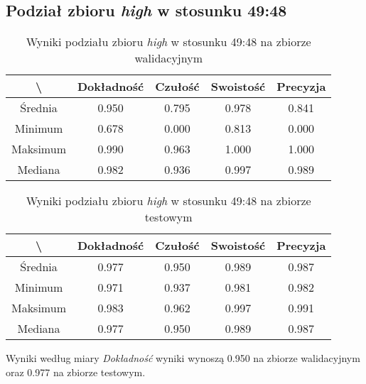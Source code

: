 \subsection{Podział zbioru \textit{high} w stosunku 49:48}


\begin{table}[H]
	\centering
	\caption{Wyniki podziału zbioru \textit{high} w stosunku 49:48 na zbiorze walidacyjnym}
	\vspace{6pt}
	{\footnotesize
		\begin{tabular}{|c|c|c|c|c|}
      \hline \textbackslash & Dokładność & Czułość & Swoistość & Precyzja \\
      \hline Średnia & 0.950 & 0.795 & 0.978 & 0.841 \\
      \hline Minimum & 0.678 & 0.000 & 0.813 & 0.000 \\
      \hline Maksimum & 0.990 & 0.963 & 1.000 & 1.000 \\
      \hline Mediana & 0.982 & 0.936 & 0.997 & 0.989 \\
      \hline
    \end{tabular}
    \label{Tab:highsplitd_val}
	}
	\vspace{0pt}
\end{table}

\begin{table}[H]
	\centering
	\caption{Wyniki podziału zbioru \textit{high} w stosunku 49:48 na zbiorze testowym}
	\vspace{6pt}
	{\footnotesize
		\begin{tabular}{|c|c|c|c|c|}
      \hline \textbackslash & Dokładność & Czułość & Swoistość & Precyzja \\
      \hline Średnia & 0.977 & 0.950 & 0.989 & 0.987 \\
      \hline Minimum & 0.971 & 0.937 & 0.981 & 0.982 \\
      \hline Maksimum & 0.983 & 0.962 & 0.997 & 0.991 \\
      \hline Mediana & 0.977 & 0.950 & 0.989 & 0.987 \\
      \hline
    \end{tabular}
    \label{Tab:highsplitd_test}
	}
	\vspace{0pt}
\end{table}

Wyniki według miary \textit{Dokładność} wyniki wynoszą 0.950 na zbiorze walidacyjnym oraz 0.977 na zbiorze testowym.
